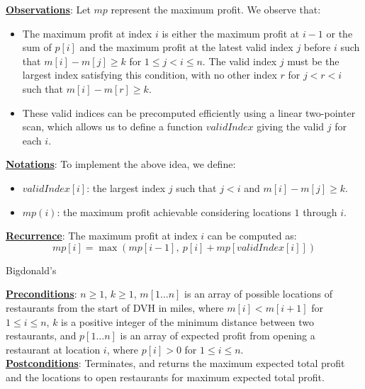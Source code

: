 \begin{customsolutionbox}
    \underline{\textbf{Observations}}: Let $mp$ represent the maximum profit. We observe that:
    \begin{itemize}
        \item The maximum profit at index $i$ is either the maximum profit at $i-1$ or the sum of $p[i]$ and the maximum profit at the latest valid index $j$ 
        before $i$ such that $m[i] - m[j] \geq k$ for $1 \leq j < i \leq n$. The valid index $j$ must be the largest index satisfying this condition, with no other index $r$ for
        $j < r < i$ such that $m[i] - m[r] \geq k$.
        \item These valid indices can be precomputed efficiently using a linear two-pointer scan, which allows us to define a function $validIndex$ giving the valid $j$ for each $i$.
    \end{itemize}

    \underline{\textbf{Notations}}: To implement the above idea, we define:
    \begin{itemize}
        \item $validIndex[i]$: the largest index $j$ such that $j < i$ and $m[i] - m[j] \geq k$.
        \item $mp(i)$: the maximum profit achievable considering locations $1$ through $i$.
    \end{itemize}

    \underline{\textbf{Recurrence}}: The maximum profit at index $i$ can be computed as:
    \[
    mp[i] = \max(mp[i-1],\ p[i] + mp[validIndex[i]])
    \]

    \begin{algorithm}[H]
        \caption{Bigdonald's} 
        \underline{\textbf{Preconditions}}: $n \geq 1$, $k \geq 1$, $m[1 \ldots n]$ is an array of possible locations 
        of restaurants from the start of DVH in miles, where $m[i] < m[i+1]$ for $1 \leq i \leq n$, $k$ is a positive 
        integer of the minimum distance between two restaurants, and $p[1 \ldots n]$ is an array of expected profit from opening a restaurant at
        location $i$, where $p[i] > 0$ for $1 \leq i \leq n$. \\
        \underline{\textbf{Postconditions}}: Terminates, and returns the maximum expected total profit and the locations to open restaurants for 
        maximum expected total profit. \\ \\
        \SetAlgoLined
\end{algorithm}
\end{customsolutionbox}
